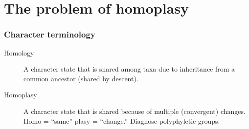 \section{The problem of homoplasy}

\begin{frame}
    \frametitle{Character terminology}
    \begin{description}
        \item[Homology] A character state that is shared among taxa due to
            inheritance from a common ancestor (shared by descent).
        \item[Homoplasy] A character state that is shared because of multiple
            (convergent) changes. Homo = ``same'' plasy = ``change.'' Diagnose
            polyphyletic groups.
    \end{description}
\end{frame}







